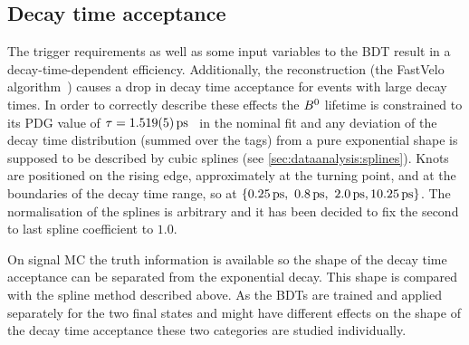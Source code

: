 \subsection{Decay time acceptance}
\label{sec:b02dd:decaytimefit:acceptance}

The trigger requirements as well as some input variables to the BDT result in
a decay-time-dependent efficiency. Additionally, the \velo reconstruction
(\ie the FastVelo algorithm~\cite{Callot:2011bza}) causes a drop in decay time
acceptance for events with large decay times. In order to correctly describe
these effects the ${{B}^0}$ lifetime is constrained to its PDG value of $\tau =
\SI{1.519\pm0.005}{\ps}$~\cite{PDG2014} in the nominal fit and any deviation
of the decay time distribution (summed over the tags) from a pure exponential
shape is supposed to be described by cubic splines (see
\cref{sec:dataanalysis:splines}). Knots are positioned on the rising edge,
approximately at the turning point, and at the boundaries of the decay time
range, so at $\{\SIlist[list-final-separator={,
}]{0.25;0.8;2.0;10.25}{\ps}\}$. The normalisation of the splines is arbitrary
and it has been decided to fix the second to last spline coefficient to
$\num{1.0}$.

On signal MC the truth information is available so the shape of the decay time
acceptance can be separated from the exponential decay. This shape is compared
with the spline method described above. As the BDTs are trained and applied
separately for the two final states and might have different effects on the
shape of the decay time acceptance these two categories are studied
individually.

